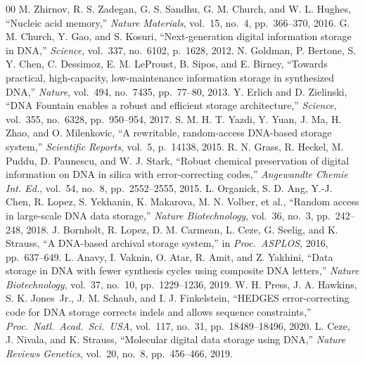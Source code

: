 \documentclass[conference]{IEEEtran}
\begin{document}
\begin{thebibliography}{00}
 M. Zhirnov, R. S. Zadegan, G. S. Sandhu, G. M. Church, and W. L. Hughes, ``Nucleic acid memory,'' \textit{Nature Materials}, vol.~15, no.~4, pp.~366--370, 2016.
 G. M. Church, Y. Gao, and S. Kosuri, ``Next-generation digital information storage in DNA,'' \textit{Science}, vol.~337, no.~6102, p.~1628, 2012.
 N. Goldman, P. Bertone, S. Y. Chen, C. Dessimoz, E. M. LeProust, B. Sipos, and E. Birney, ``Towards practical, high-capacity, low-maintenance information storage in synthesized DNA,'' \textit{Nature}, vol.~494, no.~7435, pp.~77--80, 2013.
 Y. Erlich and D. Zielinski, ``DNA Fountain enables a robust and efficient storage architecture,'' \textit{Science}, vol.~355, no.~6328, pp.~950--954, 2017.
 S. M. H. T. Yazdi, Y. Yuan, J. Ma, H. Zhao, and O. Milenkovic, ``A rewritable, random-access DNA-based storage system,'' \textit{Scientific Reports}, vol.~5, p.~14138, 2015.
 R. N. Grass, R. Heckel, M. Puddu, D. Paunescu, and W. J. Stark, ``Robust chemical preservation of digital information on DNA in silica with error-correcting codes,'' \textit{Angewandte Chemie Int. Ed.}, vol.~54, no.~8, pp.~2552--2555, 2015.
 L. Organick, S. D. Ang, Y.-J. Chen, R. Lopez, S. Yekhanin, K. Makarova, M. N. Volber, et al., ``Random access in large-scale DNA data storage,'' \textit{Nature Biotechnology}, vol.~36, no.~3, pp.~242--248, 2018.
 J. Bornholt, R. Lopez, D. M. Carmean, L. Ceze, G. Seelig, and K. Strauss, ``A DNA-based archival storage system,'' in \textit{Proc.\ ASPLOS}, 2016, pp.~637--649.
 L. Anavy, I. Vaknin, O. Atar, R. Amit, and Z. Yakhini, ``Data storage in DNA with fewer synthesis cycles using composite DNA letters,'' \textit{Nature Biotechnology}, vol.~37, no.~10, pp.~1229--1236, 2019.
 W. H. Press, J. A. Hawkins, S. K. Jones~Jr., J. M. Schaub, and I. J. Finkelstein, ``HEDGES error-correcting code for DNA storage corrects indels and allows sequence constraints,'' \textit{Proc.\ Natl.\ Acad.\ Sci.\ USA}, vol.~117, no.~31, pp.~18489--18496, 2020.
 L. Ceze, J. Nivala, and K. Strauss, ``Molecular digital data storage using DNA,'' \textit{Nature Reviews Genetics}, vol.~20, no.~8, pp.~456--466, 2019.
\end{thebibliography}
\end{document}
